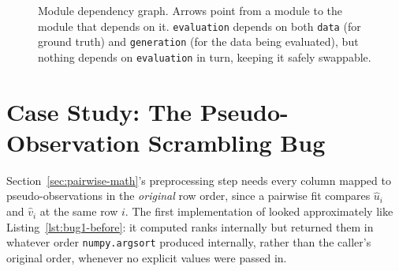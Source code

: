 \documentclass[
  english,
  class=report,
  accentcolor=2c,
  marginpar=false,
  parskip=half-,
  fontsize=11pt,
  ruledheaders=false,
  pdfa=false,
  IMRAD=false,
  thesis={type=master}
]{tudapub}
\begin{document}
\begin{figure}[ht]
\centering
{}
\caption{Module dependency graph. Arrows point from a module to the module that depends on it. \texttt{evaluation} depends on both \texttt{data} (for ground truth) and \texttt{generation} (for the data being evaluated), but nothing depends on \texttt{evaluation} in turn, keeping it safely swappable.}
\label{fig:module-diagram}
\end{figure}

\section{Case Study: The Pseudo-Observation Scrambling Bug}
\label{sec:bug-case-study-1}
Section~\ref{sec:pairwise-math}'s preprocessing step needs every column
mapped to pseudo-observations in the \emph{original} row order, since a
pairwise fit compares $\hat{u}_i$ and $\hat{v}_i$ at the same row $i$. The
first implementation of  looked
approximately like Listing~\ref{lst:bug1-before}: it computed ranks
internally but returned them in whatever order \texttt{numpy.argsort}
produced internally, rather than the caller's original order, whenever no
explicit values were passed in.
\end{document}
